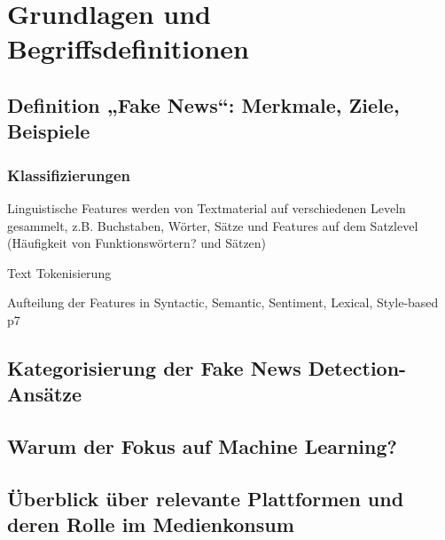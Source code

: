 \chapter{Grundlagen und Begriffsdefinitionen}
\label{chap:grundlagen_und_begriffsdefinitionen}

\section{Definition „Fake News“: Merkmale, Ziele, Beispiele}
\label{sec:definition_fake_news}


\subsection{Klassifizierungen}

Linguistische Features werden von Textmaterial auf verschiedenen Leveln gesammelt, z.B. Buchstaben, Wörter, Sätze 
und Features auf dem Satzlevel (Häufigkeit von Funktionswörtern? und Sätzen) \cite{secrypt17}

Text Tokenisierung \cite{Wagner:2010aa}

Aufteilung der Features in Syntactic, Semantic, Sentiment, Lexical, Style-based \cite{Sharma:2024} p7

\section{Kategorisierung der Fake News Detection-Ansätze}
\label{sec:kategorisierung_fake_news_detection_ansätze}

\section{Warum der Fokus auf Machine Learning?}
\label{sec:warum_fokus_machine_learning}

\section{Überblick über relevante Plattformen und deren Rolle im Medienkonsum}
\label{sec:plattformen_und_medienkonsum}

